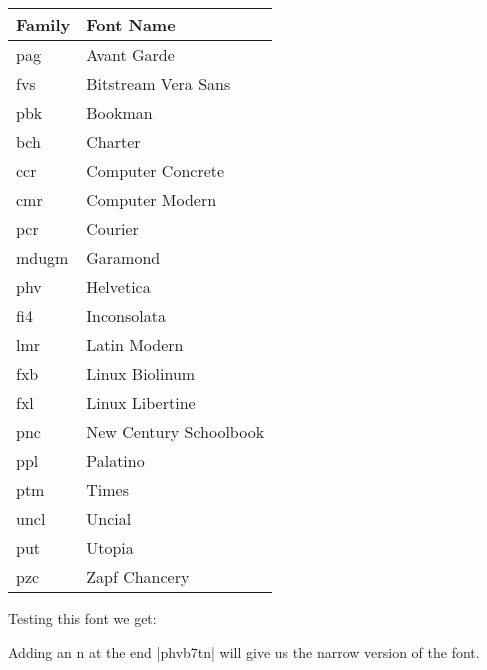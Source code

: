 \begin{multicols}{2}
\begin{tabular}{ll}
\toprule
Family       &Font Name\\
\midrule
pag          &Avant Garde\\
fvs          &Bitstream Vera Sans\\
pbk          &Bookman\\
bch          &Charter\\
ccr          &Computer Concrete\\
cmr          &Computer Modern\\
pcr          &Courier\\
mdugm      & Garamond\\
phv          &Helvetica\\
fi4          &Inconsolata\\
lmr          &Latin Modern\\
fxb          &Linux Biolinum\\
fxl          &Linux Libertine\\
pnc          &New Century Schoolbook\\
ppl          &Palatino\\
ptm          &Times\\
uncl         &Uncial\\
put          &Utopia\\
pzc          &Zapf Chancery\\
\bottomrule
\end{tabular}




Testing this font we get:


Adding an n at the end |phvb7tn| will give us the narrow version of the font.








%
\newcommand{\sample}{Typographia Ars Artium Omnium Conservatrix}
%
%
\newcommand{\thefont}[4][OT1]{%
	\textcolor{Fonts}{#2} %
	\fontencoding{#1}\fontfamily{#3}\selectfont#4\\}


\end{multicols}
